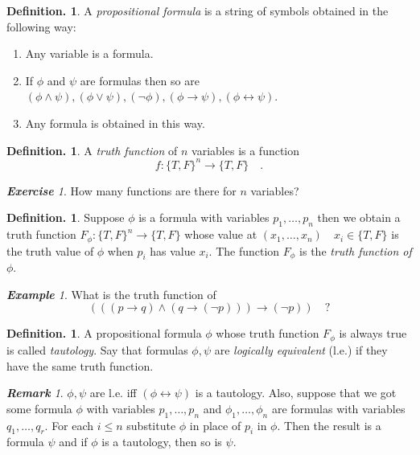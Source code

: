 \documentclass[a4paper,oneside,11pt,DIV=12,parskip=half]{scrartcl}
\theoremstyle{plain}
\theoremstyle{definition}
\newtheorem{definition}[theorem]{Definition.}
\newtheorem{remark, definition}[theorem]{Remark and Definition.}
\newtheorem{lemma, definition}[theorem]{Lemma and Definition.}
\newtheorem{theorem, definition}[theorem]{Theorem and Definition.}
\theoremstyle{remark}
\newtheorem*{remark}{\textbf{Remark}}
\newtheorem*{exercise}{\textbf{Exercise}}
\newtheorem*{example}{\textbf{Example}}
\newtheorem*{remark, example}{\textbf{Remark and Exercise}}
\begin{document}
\begin{definition}\label{Def:formula}
	A \emph{propositional formula} is a string of symbols obtained in the following way:
\begin{enumerate}
\item Any variable is a formula. \\
\item If $\phi $ and $\psi$ are formulas then so are
$(\phi \land \psi),(\phi \lor \psi), (\lnot \phi), (\phi \rightarrow \psi), (\phi \leftrightarrow \psi)$.
\item Any formula is obtained in this way.
\end{enumerate}
\end{definition}

\begin{definition}
A \emph{truth function} of $n$ variables is a function 
	\[ f: \{ T,F \}^n \rightarrow \{ T,F \} \quad. \]
\end{definition}

\begin{exercise} 
How many functions are there for $n$ variables?

\end{exercise}

\begin{definition}
Suppose $\phi$ is a formula with variables $p_1, \dots, p_n$ then we obtain a truth function $F_{\phi}: \{T,F\}^n \rightarrow \{T,F\}$ whose value at $(x_1, \dots, x_n) \quad x_i \in \{T,F\} $ is the truth value of $\phi$ when $p_i$ has value $x_i$. The function $F_{\phi}$ is the \emph{truth function of $\phi$}.
\end{definition}

\begin{example}
What is the truth function of 
\[ (((p \rightarrow q) \land (q \rightarrow (\lnot p))) \rightarrow (\lnot p)) \quad ? \]

\end{example}

\begin{definition}
A propositional formula $\phi$ whose truth function $F_{\phi}$ is always true is called \emph{tautology}.
Say that formulas $\phi, \psi$ are \emph{logically equivalent} (l.e.) if they have the same truth function.
\end{definition}

\begin{remark}
$\phi,\psi$ are l.e. iff $(\phi \leftrightarrow \psi)$ is a tautology.
Also, suppose that we got some formula $\phi$ with variables $p_1, \dots, p_n$ and $\phi_1,\dots,\phi_n$ are formulas with variables $q_1, \dots, q_r$.
For each $i \leq n$ substitute $\phi$ in place of $p_i$ in $\phi$. Then the result is a formula $ \psi$ and if $\phi$ is a tautology, then so is $\psi$.
\end{remark}
\end{document}
